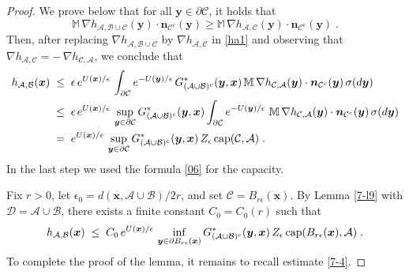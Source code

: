 \documentclass[reqno]{amsart}
\newcounter{as}[section]
\newcommand{\mc}[1]{{\mathcal #1}}
\newcommand{\bb}[1]{{\mathbb #1}}
\newcommand{\bs}[1]{{\boldsymbol #1}}
\newcommand{\<}{\langle}
\renewcommand{\>}{\rangle}
\renewcommand{\Cap}{{\rm cap}}
\begin{document}
\begin{proof}
We prove below that for all $\bs y \in \partial \mc C$, it holds that
\begin{equation}
\label{ha2}
\bb M \, \nabla h_{\mc A,
  \mc B\cup\mc C} (\bs y) \cdot \bs n_{\mc C^c}(\bs{y}) \ge \bb M \, \nabla h_{\mc A,
  \mc C} (\bs y) \cdot \bs n_{\mc C^c}(\bs{y})\;.
\end{equation}
Then, after replacing $\nabla h_{\mc A, \mc B\cup\mc C}$ by $\nabla
h_{\mc A, \mc C}$ in \eqref{ha1} and observing that $\nabla h_{\mc A,
  \mc C} = -\, \nabla h_{\mc C, \mc A}$, we conclude that
\begin{align*}
h_{\mc A, \mc B}(\bs x) \; & \le\; \epsilon\,
e^{U(\bs x)/\epsilon} \, \int_{\partial \mc C}
e^{- U(\bs y)/\epsilon} \,
G_{(\mc A \cup \mc B)^c}^* (\bs y, \bs x)
\, \bb M \, \nabla h_{\mc C, \mc A} (\bs y)
\cdot \bs n_{\mc C^c} (\bs{y}) \, \sigma(d\bs y) \\
& \le\; \epsilon\, e^{U(\bs x)/\epsilon} \,
\sup_{\bs y\in \partial \mc C}
G_{(\mc A \cup \mc B)^c}^* (\bs y, \bs x)
\int_{\partial \mc C} e^{- U(\bs y)/\epsilon} \,
\, \bb M \, \nabla h_{\mc C, \mc A} (\bs y)
\cdot \bs n_{\mc C^c} (\bs{y})\, \sigma(d\bs y) \\
& =\; e^{U(\bs x)/\epsilon} \,
\sup_{\bs y\in \partial \mc C}
G_{(\mc A \cup \mc B)^c}^* (\bs y, \bs x)\,
Z_\epsilon \, \Cap(\mc C, \mc A)\;.
\end{align*}
In the last step we used the formula \eqref{06} for the capacity.

Fix $r>0$, let $\epsilon_0 = d(\bs x, \mc A \cup \mc B)/2r$, and
set $\mc C = B_{r \epsilon}(\bs x)$. By Lemma \ref{7-l9} with $\mc D =
\mc A \cup \mc B$, there exists a finite constant $C_0 = C_0(r)$ such
that
\begin{equation*}
h_{\mc A, \mc B}(\bs x) \; \le\;
C_0 \, e^{U(\bs x)/\epsilon} \,
\inf_{\bs y\in \partial B_{r \epsilon}(\bs x)}
G_{(\mc A \cup \mc B)^c}^* (\bs y, \bs x)\,
Z_\epsilon \, \Cap(B_{r \epsilon}(\bs x), \mc A)\;.
\end{equation*}
To complete the proof of the lemma, it remains to recall estimate
\eqref{7-4}.


\end{proof}
\end{document}
